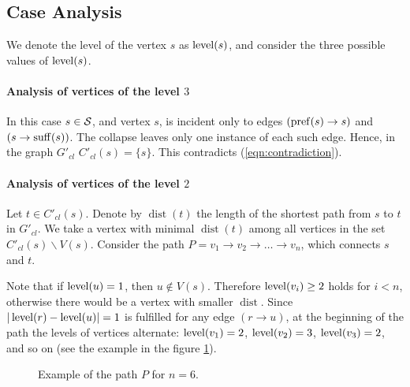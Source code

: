 \subsection{Case Analysis}
\label{sec:proof2}
We denote the level of the vertex $ s $ as $ \operatorname{level} (s) $, and consider the three possible values of $\operatorname{level}(s)$.


\paragraph{Analysis of vertices of the level \texorpdfstring{$3$}{3}}

In this case $ s \in {\cal S} $, and vertex $ s $, is incident only to edges $ (\operatorname{pref} (s) \to s)$ and $(s \to \operatorname{suff} (s)) $. The collapse leaves only one instance of each such edge. Hence, in the graph $ G'_{cl} $ $ C'_{cl} (s) = \{s \} $. This contradicts (\ref{eqn:contradiction}).

\paragraph{Analysis of vertices of the level \texorpdfstring{$2$}{2}}

Let $ t \in C'_{cl} (s) $. Denote by $ \operatorname{dist} (t) $ the length of the shortest path from $ s $ to $ t $ in $ G'_{cl} $. We take a vertex with minimal $ \operatorname{dist} (t) $ among all vertices in the set $ C'_{cl} (s) \backslash V (s) $. Consider the path $ P = v_1 \to v_2 \to \ldots \to v_n $, which connects $ s $ and $ t $.

Note that if $ \operatorname{level} (u) = 1 $, then $ u \notin V (s) $. Therefore $ \operatorname{level} (v_i) \ge 2 $ holds for $ i<n $, otherwise there would be a vertex with smaller $ \operatorname {dist} $. Since $ | \operatorname{level} (r) - \operatorname{level} (u) | = 1 $ is fulfilled for any edge $ (r \to u) $, at the beginning of the path the levels of vertices alternate: $ \operatorname{level} (v_1) = 2 $, $ \operatorname{level} (v_2) = 3 $, $ \operatorname{level} (v_3) = 2 $, and so on (see the example in the figure \ref{fig:lvl2path6}).

\begin{figure}[ht]
\begin{center}

\end{center}

\caption{Example of the path $P$ for $n=6$.}\label{fig:lvl2path6}
\end{figure}

